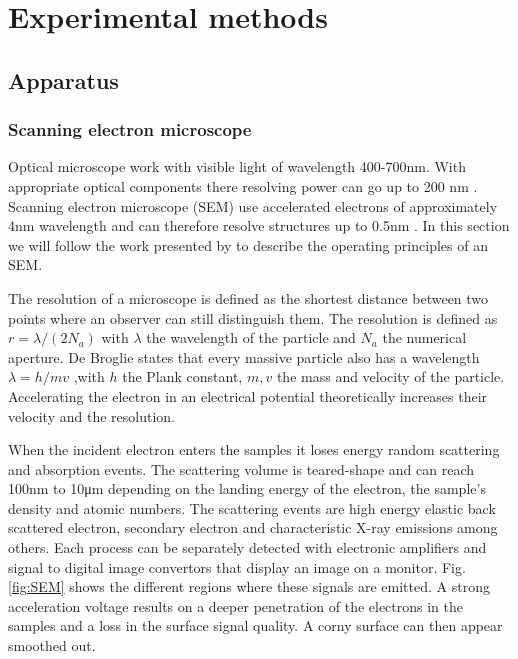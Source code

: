 \documentclass[../main.tex]{subfiles}
\begin{document}
\section{Experimental methods}
    \subsection{Apparatus}
    \subsubsection{Scanning electron microscope}
    Optical microscope work with visible light of wavelength 400-700\si{\nano\meter}. With appropriate optical components there resolving power can go up to 200 \si{\nano\meter} \cite{zhou2006fundamentals}. 
    Scanning electron microscope (SEM) use accelerated electrons of approximately 4\si{\nano\meter} wavelength and can therefore resolve structures up to 0.5\si{\nano\meter} \cite{zhou2006fundamentals}.
    In this section we will follow the work presented by \cite{kannan2018scanning} to describe the operating principles of an SEM.
    
    The resolution of a microscope is defined as the shortest distance between two points where an observer can still distinguish them. The resolution is defined as $r=\lambda/(2N_a)$ 
    with $\lambda$ the wavelength of the particle and $N_a$ the numerical aperture. De Broglie states that every massive particle also has a wavelength  $\lambda = h/mv$ ,with $h$ the Plank constant,
    $m,v$ the mass and velocity of the particle. Accelerating the electron in an electrical potential theoretically increases their velocity and the resolution. 

    When the incident electron enters the samples it loses energy random scattering and absorption events. The scattering volume is teared-shape and can reach 100\si{\nano\meter} to
    10\si{\micro\meter} depending on the landing energy of the electron, the sample's density and atomic numbers. The scattering events are high energy elastic back scattered electron,
    secondary electron and characteristic X-ray emissions among others. Each process can be separately detected with electronic amplifiers and signal to digital image convertors that 
    display an image on a monitor. Fig. \ref{fig:SEM} shows the different regions where these signals are emitted. A strong acceleration voltage results on a deeper penetration of the electrons
    in the samples and a loss in the surface signal quality. A corny surface can then appear smoothed out.
\end{document}
